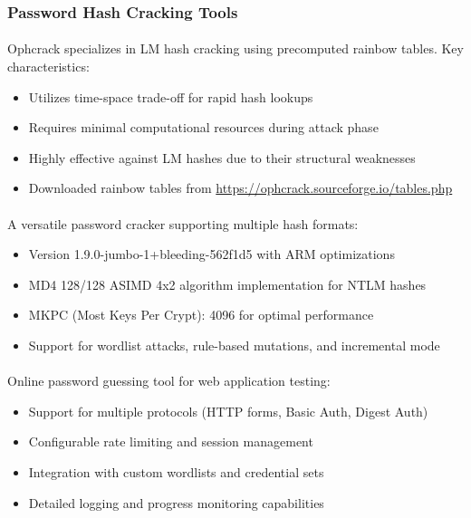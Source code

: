 \subsubsection{Password Hash Cracking Tools}

\paragraph{}
Ophcrack specializes in LM hash cracking using precomputed rainbow tables. Key characteristics:
\begin{itemize}
    \item Utilizes time-space trade-off for rapid hash lookups
    \item Requires minimal computational resources during attack phase
    \item Highly effective against LM hashes due to their structural weaknesses
    \item Downloaded rainbow tables from \url{https://ophcrack.sourceforge.io/tables.php}
\end{itemize}

\paragraph{}
A versatile password cracker supporting multiple hash formats:
\begin{itemize}
    \item Version 1.9.0-jumbo-1+bleeding-562f1d5 with ARM optimizations
    \item MD4 128/128 ASIMD 4x2 algorithm implementation for NTLM hashes
    \item MKPC (Most Keys Per Crypt): 4096 for optimal performance
    \item Support for wordlist attacks, rule-based mutations, and incremental mode
\end{itemize}

\paragraph{}
Online password guessing tool for web application testing:
\begin{itemize}
    \item Support for multiple protocols (HTTP forms, Basic Auth, Digest Auth)
    \item Configurable rate limiting and session management
    \item Integration with custom wordlists and credential sets
    \item Detailed logging and progress monitoring capabilities
\end{itemize}

